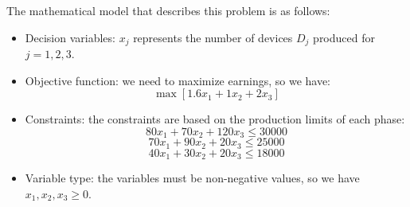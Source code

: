 \begin{example}
    The mathematical model that describes this problem is as follows:
    \begin{itemize}
        \item Decision variables: $x_j$ represents the number of devices $D_j$ produced for $j=1,2,3$.
        \item Objective function: we need to maximize earnings, so we have: 
            \[\max{\left[1.6x_1+1x_2+2x_3\right]}\]
        \item Constraints: the constraints are based on the production limits of each phase:
            \[80x_1+70x_2+120x_3 \leq 30000\]
            \[70x_1+90x_2+20x_3 \leq 25000\]
            \[40x_1+30x_2+20x_3 \leq 18000\]
        \item Variable type: the variables must be non-negative values, so we have $x_1,x_2,x_3 \geq 0$.
    \end{itemize}
\end{example}
